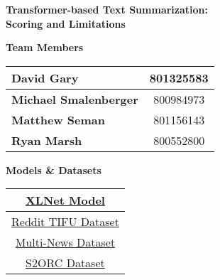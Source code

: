 \setlength{\headheight}{15pt}

\vspace{-2pt}

\begin{center}
    \begin{Large}
        \noindent\textbf{Transformer-based Text Summarization:\\Scoring and Limitations}
    \end{Large}
\end{center}

\vspace{-10pt}

\begin{multicols}{2}

    \begin{center}
        \begin{large}
            \noindent\textbf{Team Members}
        \end{large}
    \end{center}
    \begin{center}
        \begin{tabular}{|lc|}
            \hline
            \textbf{David Gary} & 801325583 \\ \hline
            \textbf{Michael Smalenberger} & 800984973 \\ \hline
            \textbf{Matthew Seman} & 801156143 \\ \hline
            \textbf{Ryan Marsh} & 800552800 \\ \hline
        \end{tabular}
    \end{center}

    \begin{center}
        \begin{large}
            \noindent\textbf{Models \& Datasets}
        \end{large}
    \end{center}

    \begin{center}
        \begin{tabular}{|c|}
            \hline
            \href{https://github.com/zihangdai/xlnet}{XLNet Model} \\ \hline
            \href{https://paperswithcode.com/dataset/reddit-tifu}{Reddit TIFU Dataset} \\ \hline
            \href{https://paperswithcode.com/dataset/multi-news}{Multi-News Dataset} \\ \hline
            \href{https://paperswithcode.com/dataset/s2orc}{S2ORC Dataset} \\ \hline
        \end{tabular}
    \end{center}

\end{multicols}

